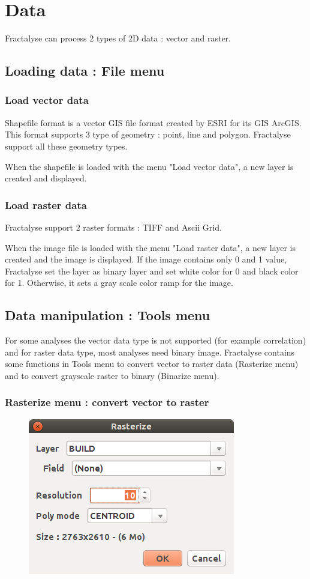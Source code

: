 \documentclass[a4paper,10pt]{report}
\begin{document}
\chapter{Data}
Fractalyse can process 2 types of 2D data : vector and raster.
\section{Loading data : File menu}
\subsection{Load vector data}
Shapefile format is a vector GIS file format created by ESRI for its GIS ArcGIS.
This format supports 3 type of geometry : point, line and polygon.
Fractalyse support all these geometry types. 

When the shapefile is loaded with the menu "Load vector data", a new layer is created and displayed.

\subsection{Load raster data}
Fractalyse support 2 raster formats : TIFF and Ascii Grid.

When the image file is loaded with the menu "Load raster data", a new layer is created and the image is displayed. If the image contains only 0 and 1 value, Fractalyse set the layer as binary layer and set white color for 0 and black color for 1. Otherwise, it sets a gray scale color ramp for the image.


\section{Data manipulation : Tools menu}
For some analyses the vector data type is not supported (for example correlation) and for raster data type, most analyses need binary image. Fractalyse contains some functions in Tools menu to convert vector to raster data (Rasterize menu) and to convert grayscale raster to binary (Binarize menu).

\subsection{Rasterize menu : convert vector to raster}
\begin{figure}[H]
	\includegraphics[scale=0.5]{img/rasterize-en.png}
\end{figure}
\end{document}
